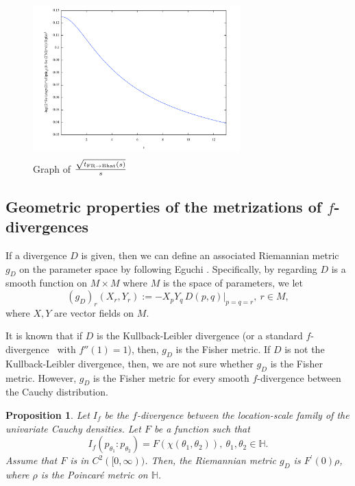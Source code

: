 \documentclass[journal]{IEEEtran}
\newtheorem{proposition}[theorem]{Proposition}
\begin{document}
\begin{figure}
\begin{center}
\includegraphics[width= 8cm, height= 6cm, bb= 0 0 846 594]{Figure-sqrt-Bhat-Cauchy.pdf}
\caption{Graph of $\frac{\sqrt{t_{\mathrm{FR} \rightarrow \mathrm{Bhat}}(s)}}{s}$}\label{fig:fig1}
\end{center}
\end{figure}




\subsection{Geometric properties of the metrizations of $f$-divergences}



If a divergence $D$ is given, then we can define an associated Riemannian metric $g_D$ on the parameter space by following Eguchi \cite{Eguchi1983, Eguchi1992}. 
Specifically, by regarding $D$ is a smooth function on $M \times M$ where $M$ is the space of parameters, 
we let 
\[ (g_D)_r (X_r, Y_r)  := -X_p Y_q\, D(p,q) |_{p=q=r}, \ r \in M, \]
where $X, Y$ are vector fields on $M$. 

It is known that if $D$ is the Kullback-Leibler divergence (or a standard $f$-divergence~\cite{IG-2016} with $f''(1)=1$), then, $g_D$ is the Fisher metric. 
If $D$ is not the Kullback-Leibler divergence, then, we are not sure whether $g_D$ is the Fisher metric. 
However, $g_D$ is the Fisher metric for every smooth $f$-divergence between the Cauchy distribution. 

\begin{proposition}\label{prop:local}
Let $I_f$ be the $f$-divergence between the location-scale family of the univariate Cauchy densities. 
Let $F$ be a function such that 
$$ I_f (p_{\theta_1} : p_{\theta_2}) = F(\chi(\theta_1, \theta_2)), \ \theta_1, \theta_2 \in \mathbb H.$$
Assume that $F$ is in $C^2 ([0, \infty))$. 
Then, the Riemannian metric $g_D$ is $F^{\prime}(0) \rho$, where $\rho$ is the Poincar\'e metric on $\mathbb H$. 
\end{proposition}
\end{document}

